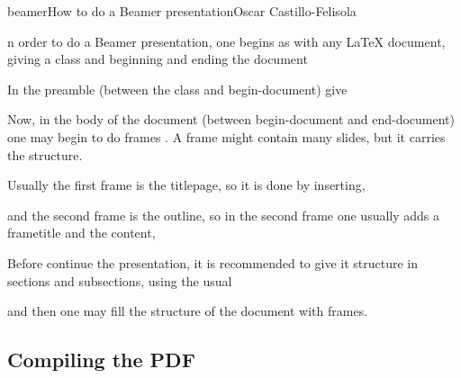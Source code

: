\begin{article}[2]{beamer}{How to do a Beamer presentation}{Oscar Castillo-Felisola}

  n order to do a Beamer presentation, one begins as with any LaTeX document, giving a class and beginning and ending the document




  In the preamble (between the class and begin-document) give






  Now, in the body of the document (between begin-document and end-document)  one may begin to do frames . A frame might contain many slides, but it carries the structure.



  Usually the first frame is the titlepage, so it is done by inserting,


  and the second frame is the outline, so in the second frame one usually adds a frametitle and the content,



  Before continue the presentation, it is recommended to give it structure in sections and subsections, using the usual



  and then one may fill the structure of the document with frames.
  \subsection{Compiling the PDF}


\end{article}
